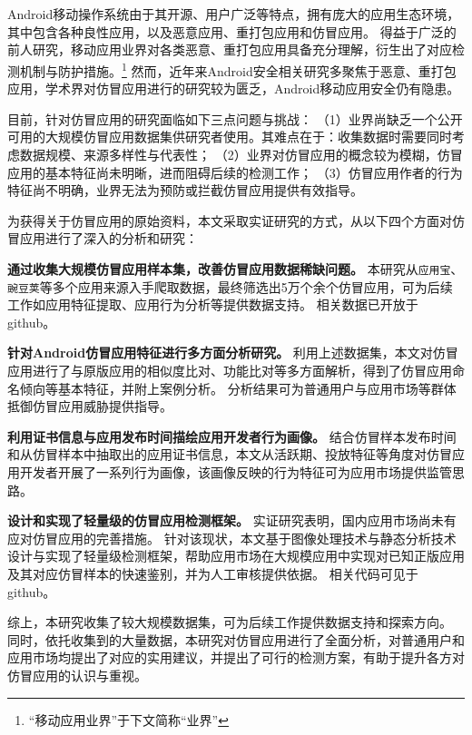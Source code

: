 \cleardoublepage{}

\chapter*{}
\vspace{-5mm}

\setlength{\baselineskip}{25pt} %

Android移动操作系统由于其开源、用户广泛等特点，拥有庞大的应用生态环境，其中包含各种良性应用，以及恶意应用、重打包应用和仿冒应用。
得益于广泛的前人研究，移动应用业界对各类恶意、重打包应用具备充分理解，衍生出了对应检测机制与防护措施。\footnote{``移动应用业界''于下文简称``业界''}
然而，近年来Android安全相关研究多聚焦于恶意、重打包应用，学术界对仿冒应用进行的研究较为匮乏，Android移动应用安全仍有隐患。

目前，针对仿冒应用的研究面临如下三点问题与挑战：
（1）业界尚缺乏一个公开可用的大规模仿冒应用数据集供研究者使用。其难点在于：收集数据时需要同时考虑数据规模、来源多样性与代表性；
（2）业界对仿冒应用的概念较为模糊，仿冒应用的基本特征尚未明晰，进而阻碍后续的检测工作；
（3）仿冒应用作者的行为特征尚不明确，业界无法为预防或拦截仿冒应用提供有效指导。

为获得关于仿冒应用的原始资料，本文采取实证研究的方式，从以下四个方面对仿冒应用进行了深入的分析和研究：

\textbf{通过收集大规模仿冒应用样本集，改善仿冒应用数据稀缺问题。}
本研究从\texttt{应用宝}、\texttt{豌豆荚}等多个应用来源入手爬取数据，最终筛选出5万个余个仿冒应用，可为后续工作如应用特征提取、应用行为分析等提供数据支持。
相关数据已开放于github。

\textbf{针对Android仿冒应用特征进行多方面分析研究。}
利用上述数据集，本文对仿冒应用进行了与原版应用的相似度比对、功能比对等多方面解析，得到了仿冒应用命名倾向等基本特征，并附上案例分析。
分析结果可为普通用户与应用市场等群体抵御仿冒应用威胁提供指导。

\textbf{利用证书信息与应用发布时间描绘应用开发者行为画像。}
结合仿冒样本发布时间和从仿冒样本中抽取出的应用证书信息，本文从活跃期、投放特征等角度对仿冒应用开发者开展了一系列行为画像，该画像反映的行为特征可为应用市场提供监管思路。

\textbf{设计和实现了轻量级的仿冒应用检测框架。}
实证研究表明，国内应用市场尚未有应对仿冒应用的完善措施。
针对该现状，本文基于图像处理技术与静态分析技术设计与实现了轻量级检测框架\mytool ，帮助应用市场在大规模应用中实现对已知正版应用及其对应仿冒样本的快速鉴别，并为人工审核提供依据。
相关代码可见于github。

综上，本研究收集了较大规模数据集，可为后续工作提供数据支持和探索方向。
同时，依托收集到的大量数据，本研究对仿冒应用进行了全面分析，对普通用户和应用市场均提出了对应的实用建议，并提出了可行的检测方案，有助于提升各方对仿冒应用的认识与重视。

 
